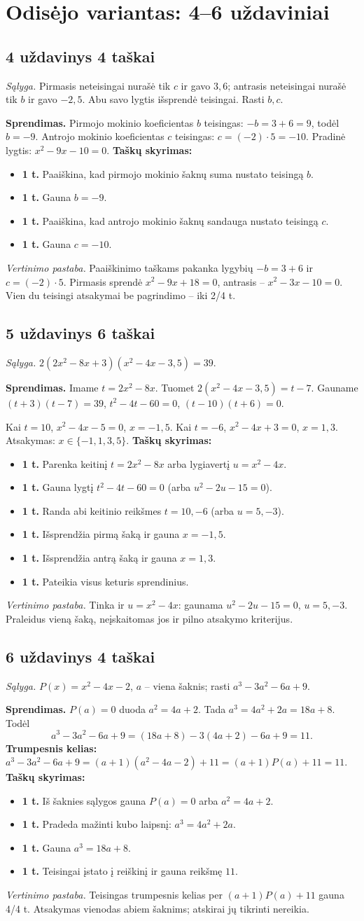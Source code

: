 \documentclass[11pt,a4paper]{article}
\newcommand{\uzd}[3]{\subsection*{#1 uždavinys \hfill #2 taškai}\textit{Sąlyga.} #3\par}
\newcommand{\kriterijai}{\textbf{Taškų skyrimas:}}
\newcommand{\balas}[2]{\item \textbf{#1 t.} #2}
\begin{document}
\section*{Odisėjo variantas: 4--6 uždaviniai}
\uzd{4}{4}{Pirmasis neteisingai nurašė tik $c$ ir gavo $3,6$; antrasis neteisingai nurašė tik $b$ ir gavo $-2,5$. Abu savo lygtis išsprendė teisingai. Rasti $b,c$.}
\textbf{Sprendimas.} Pirmojo mokinio koeficientas $b$ teisingas: $-b=3+6=9$, todėl $b=-9$. Antrojo mokinio koeficientas $c$ teisingas: $c=(-2)\cdot5=-10$. Pradinė lygtis: $x^2-9x-10=0$.
\kriterijai\begin{itemize}
\balas{1}{Paaiškina, kad pirmojo mokinio šaknų suma nustato teisingą $b$.}
\balas{1}{Gauna $b=-9$.}
\balas{1}{Paaiškina, kad antrojo mokinio šaknų sandauga nustato teisingą $c$.}
\balas{1}{Gauna $c=-10$.}
\end{itemize}
\textit{Vertinimo pastaba.} Paaiškinimo taškams pakanka lygybių $-b=3+6$ ir $c=(-2)\cdot5$. Pirmasis sprendė $x^2-9x+18=0$, antrasis -- $x^2-3x-10=0$. Vien du teisingi atsakymai be pagrindimo -- iki 2/4 t.
\uzd{5}{6}{$2(2x^2-8x+3)(x^2-4x-3{,}5)=39$.}
\textbf{Sprendimas.} Imame $t=2x^2-8x$. Tuomet $2(x^2-4x-3{,}5)=t-7$. Gauname $(t+3)(t-7)=39$, $t^2-4t-60=0$, $(t-10)(t+6)=0$.\par Kai $t=10$, $x^2-4x-5=0$, $x=-1,5$. Kai $t=-6$, $x^2-4x+3=0$, $x=1,3$. Atsakymas: $x\in\{-1,1,3,5\}$.
\kriterijai\begin{itemize}
\balas{1}{Parenka keitinį $t=2x^2-8x$ arba lygiavertį $u=x^2-4x$.}
\balas{1}{Gauna lygtį $t^2-4t-60=0$ (arba $u^2-2u-15=0$).}
\balas{1}{Randa abi keitinio reikšmes $t=10,-6$ (arba $u=5,-3$).}
\balas{1}{Išsprendžia pirmą šaką ir gauna $x=-1,5$.}
\balas{1}{Išsprendžia antrą šaką ir gauna $x=1,3$.}
\balas{1}{Pateikia visus keturis sprendinius.}
\end{itemize}
\textit{Vertinimo pastaba.} Tinka ir $u=x^2-4x$: gaunama $u^2-2u-15=0$, $u=5,-3$. Praleidus vieną šaką, neįskaitomas jos ir pilno atsakymo kriterijus.
\uzd{6}{4}{$P(x)=x^2-4x-2$, $a$ -- viena šaknis; rasti $a^3-3a^2-6a+9$.}
\textbf{Sprendimas.} $P(a)=0$ duoda $a^2=4a+2$. Tada $a^3=4a^2+2a=18a+8$. Todėl\[a^3-3a^2-6a+9=(18a+8)-3(4a+2)-6a+9=11.\]\textbf{Trumpesnis kelias:} $a^3-3a^2-6a+9=(a+1)(a^2-4a-2)+11=(a+1)P(a)+11=11$.
\kriterijai\begin{itemize}
\balas{1}{Iš šaknies sąlygos gauna $P(a)=0$ arba $a^2=4a+2$.}
\balas{1}{Pradeda mažinti kubo laipsnį: $a^3=4a^2+2a$.}
\balas{1}{Gauna $a^3=18a+8$.}
\balas{1}{Teisingai įstato į reiškinį ir gauna reikšmę $11$.}
\end{itemize}
\textit{Vertinimo pastaba.} Teisingas trumpesnis kelias per $(a+1)P(a)+11$ gauna 4/4 t. Atsakymas vienodas abiem šaknims; atskirai jų tikrinti nereikia.
\newpage
\end{document}
